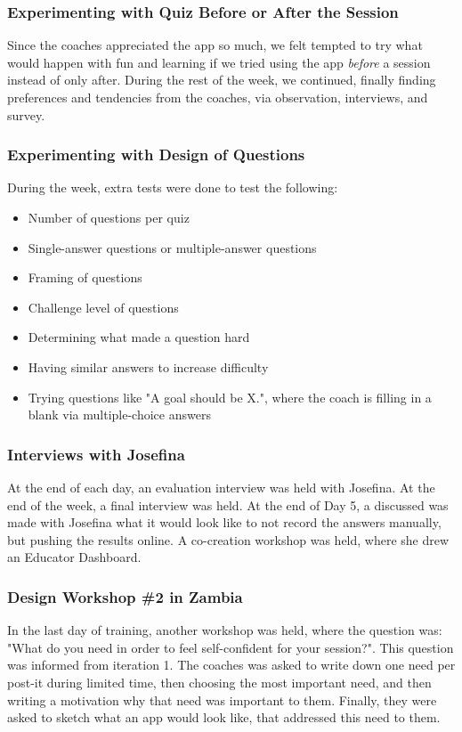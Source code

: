 \subsubsection{Experimenting with Quiz Before or After the Session}
Since the coaches appreciated the app so much, we felt tempted to try what would happen with fun and learning if we tried using the app \textit{before} a session instead of only after. During the rest of the week, we continued, finally finding preferences and tendencies from the coaches, via observation, interviews, and survey.

\subsubsection{Experimenting with Design of Questions}
During the week, extra tests were done to test the following:

\begin{itemize}
\item Number of questions per quiz
\item Single-answer questions or multiple-answer questions
\item Framing of questions
\item Challenge level of questions
\item Determining what made a question hard
\item Having similar answers to increase difficulty
\item Trying questions like "A goal should be X.", where the coach is filling in a blank via multiple-choice answers
\end{itemize}

\subsubsection{Interviews with Josefina}
At the end of each day, an evaluation interview was held with Josefina. At the end of the week, a final interview was held. At the end of Day 5, a discussed was made with Josefina what it would look like to not record the answers manually, but pushing the results online. A co-creation workshop was held, where she drew an Educator Dashboard.

\subsubsection{Design Workshop \#2 in Zambia}
In the last day of training, another workshop was held, where the question was: "What do you need in order to feel self-confident for your session?". This question was informed from iteration 1. The coaches was asked to write down one need per post-it during limited time, then choosing the most important need, and then writing a motivation why that need was important to them. Finally, they were asked to sketch what an app would look like, that addressed this need to them.
